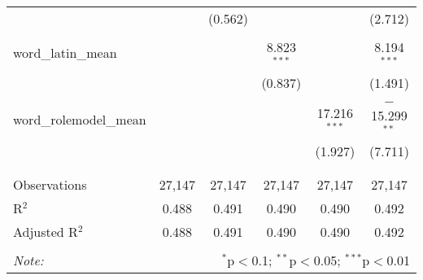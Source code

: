 \begin{table}[!htbp]
\begin{tabular}{@{\extracolsep{-2pt}}lccccc}
  &  & (0.562) &  &  & (2.712) \\ 
  & & & & & \\ 
 word\_latin\_mean &  &  & 8.823$^{***}$ &  & 8.194$^{***}$ \\ 
  &  &  & (0.837) &  & (1.491) \\ 
  & & & & & \\ 
 word\_rolemodel\_mean &  &  &  & 17.216$^{***}$ & $-$15.299$^{**}$ \\ 
  &  &  &  & (1.927) & (7.711) \\ 
  & & & & & \\ 
\hline \\[-1.8ex] 
Observations & 27,147 & 27,147 & 27,147 & 27,147 & 27,147 \\ 
R$^{2}$ & 0.488 & 0.491 & 0.490 & 0.490 & 0.492 \\ 
Adjusted R$^{2}$ & 0.488 & 0.491 & 0.490 & 0.490 & 0.492 \\ 
\hline 
\hline \\[-1.8ex] 
\textit{Note:}  & \multicolumn{5}{r}{$^{*}$p$<$0.1; $^{**}$p$<$0.05; $^{***}$p$<$0.01} \\ 
\end{tabular} 
\end{table} 
